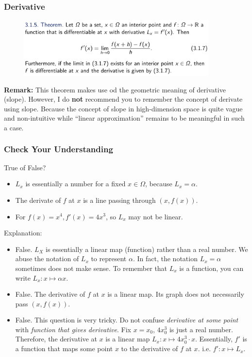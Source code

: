 \documentclass[10pt, t]{beamer}
\renewcommand{\emph}[1]{{\color{themecolor}\textsl{#1}}}
\begin{document}
\begin{frame}
    \frametitle{Derivative}
    \begin{figure}[H]
        \centering
        \includegraphics[width=0.9\textwidth]{2020-10-28-14-34-43.png}
    \end{figure}
    \textbf{Remark:} This theorem makes use od the geometric meaning of derivative (slope). However, I do \textbf{not} recommend you to remember the concept of derivate using slope. Because the concept of slope in high-dimension space is quite vague and non-intuitive while ``linear approximation'' remains to be meaningful in such a case.
\end{frame}

\begin{frame}
    \frametitle{Check Your Understanding}
    True of False?
    \begin{itemize}
        \item $L_x$ is essentially a number for a fixed $x\in\Omega$, because $L_x=\alpha$.
        \item The derivate of $f$ at $x$ is a line passing through $(x,f(x))$.
        \item For $f(x)=x^4,f'(x)=4x^3$, so $L_x$ may not be linear.
    \end{itemize}
    \pause
    Explanation:
    \begin{itemize}
        \item False. $L_X$ is essentially a linear map (function) rather than a real number. We abuse the notation of $L_x$ to represent $\alpha$. In fact, the notation $L_x=\alpha$ sometimes does not make sense. To remember that $L_x$ is a function, you can write $L_x:x\mapsto \alpha x$.
        \item False. The derivative of $f$ at $x$ is a linear map. Its graph does not necessarily pass $(x,f(x))$.
        \item False. This question is very tricky. Do not confuse \emph{derivative at some point} with \emph{function that gives derivative}. Fix $x=x_0$, $4x_0^3$ is just a real number. Therefore, the derivative at $x$ is a linear map $L_x:x\mapsto 4x_0^3\cdot x$. Essentially, $f'$ is a function that maps some point $x$ to the derivative of $f$ at $x$. i.e. $f':x\mapsto L_x$.
    \end{itemize}
\end{frame}
\end{document}
